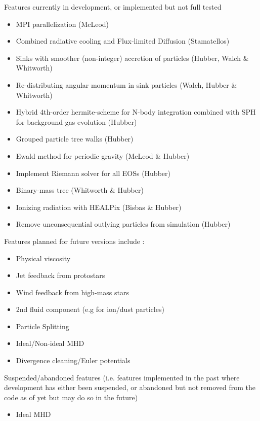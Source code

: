 \documentclass[a4paper]{article}
\begin{document}
\noindent Features currently in development, or implemented but not full tested
\begin{itemize}
\item MPI parallelization (McLeod)
\item Combined radiative cooling and Flux-limited Diffusion (Stamatellos)
\item Sinks with smoother (non-integer) accretion of particles (Hubber, Walch \& Whitworth)
\item Re-distributing angular momentum in sink particles (Walch, Hubber \& Whitworth)
\item Hybrid 4th-order hermite-scheme for N-body integration combined with SPH for background gas evolution (Hubber)
\item Grouped particle tree walks (Hubber)
\item Ewald method for periodic gravity (McLeod \& Hubber)
\item Implement Riemann solver for all EOSs (Hubber)
\item Binary-mass tree (Whitworth \& Hubber)
\item Ionizing radiation with HEALPix (Bisbas \& Hubber)
\item Remove unconsequential outlying particles from simulation (Hubber)
\end{itemize}

\noindent Features planned for future versions include : 
\begin{itemize}
\item Physical viscosity
\item Jet feedback from protostars
\item Wind feedback from high-mass stars
\item 2nd fluid component (e.g for ion/dust particles) 
\item Particle Splitting 
\item Ideal/Non-ideal MHD 
\item Divergence cleaning/Euler potentials
\end{itemize}


\noindent Suspended/abandoned features (i.e. features implemented in the past where development has either been suspended, or abandoned but not removed from the code as of yet but may do so in the future)
\begin{itemize}
\item Ideal MHD
\end{itemize}

\newpage
\end{document}
